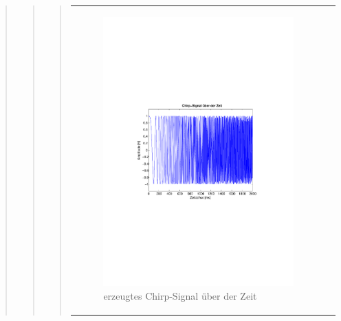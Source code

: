 \begin{quote}
\begin{quote}
\begin{quote}
\begin{center}
\begin{tabular}{ll}
\begin{minipage}{0.6\textwidth}
                        \begin{figure}[H]
                            \label{fig:}
                            \includegraphics[scale=0.63, trim = 3cm 9cm 3cm
                            9cm, clip]{./Bilder/bsp_chirp}
                            \caption{erzeugtes Chirp-Signal über der Zeit}
                        \end{figure}
    
                    \end{minipage}
                    \begin{minipage}{0.6\textwidth}
    

\end{minipage}
\end{tabular}
\end{center}
\end{quote}
\end{quote}
\end{quote}
